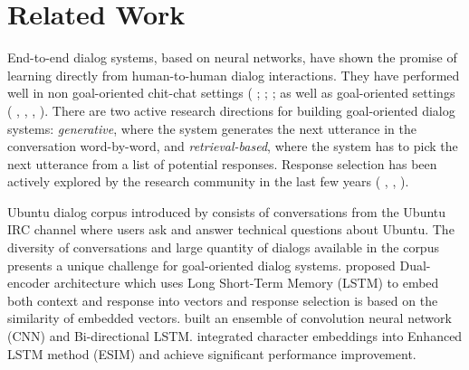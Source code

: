 \documentclass[letterpaper]{article} %
\begin{document}
\section{Related Work}
\label{related-work}
End-to-end dialog systems, based on neural networks, have shown the promise of learning directly from human-to-human dialog interactions. They have performed well in non goal-oriented chit-chat settings (
\citeauthor{vinyals2015neural} ; \citeauthor{sordoni2015neural} ; \citeauthor{serban2016building} ;
as well as goal-oriented settings (\citeauthor{le2016lstm} , \citeauthor{ghazvininejad2017knowledge} ,  \citeauthor{bordes2016learning} , \citeauthor{seo2016query} ). There are two active research directions for building goal-oriented dialog systems: \textit{generative}, where the system generates the next utterance in the conversation word-by-word, and \textit{retrieval-based}, where the system has to pick the next utterance from a list of potential responses. Response selection has been actively explored by the research community in the last few years (\citeauthor{dong2018enhance} , \citeauthor{wu2016sequential} , \citeauthor{bartl2017retrieval} ).

Ubuntu dialog corpus introduced by \citeauthor{lowe2015ubuntu}  consists of conversations from the Ubuntu IRC channel where users ask and answer technical questions about Ubuntu. The diversity of conversations and large quantity of dialogs available in the corpus presents a unique challenge for goal-oriented dialog systems. \citeauthor{lowe2015ubuntu}  proposed Dual-encoder architecture which uses Long Short-Term Memory (LSTM) \cite{hochreiter1997long} to embed both context and response into vectors and response selection is based on the similarity of embedded vectors. \citeauthor{kadlec2015improved}  built an ensemble of convolution neural network (CNN) \citeauthor{krizhevsky2012imagenet}  and Bi-directional LSTM. 
\citeauthor{dong2018enhance}  integrated character embeddings \cite{dos2015boosting} into Enhanced LSTM method (ESIM) \cite{chen2017enhanced} and achieve significant performance improvement.
\end{document}
